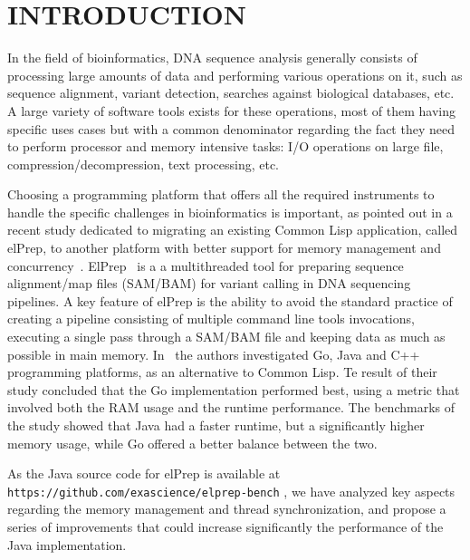 \documentclass[a4paper,twoside]{article}
\begin{document}
\section{\uppercase{Introduction}}
\label{sec:introduction}

In the field of bioinformatics, DNA sequence analysis generally consists of processing large amounts of data and performing various operations on it, 
such as sequence alignment, variant detection, searches against biological databases, etc.
A large variety of software tools exists for these operations, most of them having specific uses cases but with a common denominator 
regarding the fact they need to perform processor and memory intensive tasks: 
I/O operations on large file, compression/decompression, text processing, etc.~\cite{?}

Choosing a programming platform that offers all the required instruments to handle the specific challenges in bioinformatics is important, 
as pointed out in a recent study dedicated to migrating an existing Common Lisp application, called elPrep, 
to another platform with better support for memory management and concurrency~\cite{costanza:2019}.
ElPrep~\cite{herzeel:2019} is a a multithreaded tool for preparing sequence alignment/map files (SAM/BAM)
for variant calling in DNA sequencing pipelines. 
A key feature of elPrep is the ability to avoid the standard practice of creating a pipeline consisting of multiple command line tools invocations, 
executing a single pass through a SAM/BAM file and keeping data as much as possible in main memory.
In~\cite{costanza:2019} the authors investigated Go, Java and C++ programming platforms, as an alternative to Common Lisp.
Te result of their study concluded that the Go implementation performed best, using a metric that involved both the RAM usage and the runtime performance.
The benchmarks of the study showed that Java had a faster runtime, but a significantly higher memory usage, while Go offered a better balance between the two.

As the Java source code for elPrep is available at {\texttt{https://github.com/exascience/elprep-bench} }, we have analyzed key aspects regarding the memory management and
thread synchronization, and propose a series of improvements that could increase significantly the performance of the Java implementation. 
\end{document}
